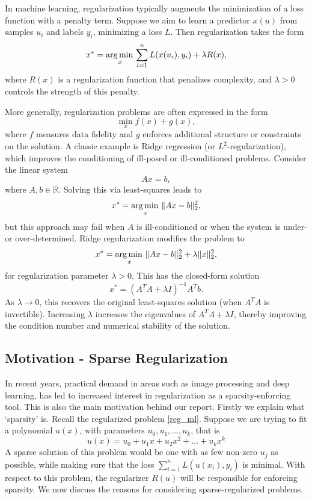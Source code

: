 \documentclass[11pt, twoside]{report}
\begin{document}
In machine learning, regularization typically augments the minimization of a loss function with a penalty term. Suppose we aim to learn a predictor $x(u)$ from samples $u_i$ and labels $y_i$, minimizing a loss $L$. Then regularization takes the form
\begin{equation} \label{reg_ml}
    x^* = \operatorname*{arg\, min \,}_x \sum_{i=1}^n L(x(u_i), y_i) + \lambda R(x),
\end{equation}
where $R(x)$ is a regularization function that penalizes complexity, and $\lambda > 0$ controls the strength of this penalty.

More generally, regularization problems are often expressed in the form
\[
\min_x f(x) + g(x),
\]
where $f$ measures data fidelity and $g$ enforces additional structure or constraints on the solution. A classic example is Ridge regression (or $L^2$-regularization), which improves the conditioning of ill-posed or ill-conditioned problems. Consider the linear system
\begin{equation} \label{lin_sys}
    Ax = b,
\end{equation}
where $A, b \in \mathbb{R}$. Solving this via least-squares leads to
\[
x^* = \operatorname*{arg\, min \,}_{x} \|Ax - b\|_2^2,
\]
but this approach may fail when $A$ is ill-conditioned or when the system is under- or over-determined. Ridge regularization modifies the problem to
\[
x^* = \operatorname*{arg\, min \,}_{x} \|Ax - b\|_2^2 + \lambda \|x\|_2^2,
\]
for regularization parameter $\lambda > 0$. This has the closed-form solution
\[
x^* = (A^T A + \lambda I)^{-1} A^T b.
\]
As $\lambda \to 0$, this recovers the original least-squares solution (when $A^T A$ is invertible). Increasing $\lambda$ increases the eigenvalues of $A^T A + \lambda I$, thereby improving the condition number and numerical stability of the solution.


\subsection{Motivation - Sparse Regularization}
In recent years, practical demand in areas such as image processing and deep learning, has led to increased interest in regularization as a sparsity-enforcing tool. This is also the main motivation behind our report. Firstly we explain what `sparsity' is. Recall the regularized problem \ref{reg_ml}. Suppose we are trying to fit a polynomial $u(x)$, with parameters $u_0,u_1,\hdots, u_k$, that is
\[u(x) = u_0 + u_1 x + u_2 x^2 + \hdots + u_kx^k\]
A sparse solution of this problem would be one with as few non-zero $u_j$ as possible, while making sure that the loss $\sum^n_{i=1} L(u(x_i),y_i)$ is minimal. With respect to this problem, the regularizer $R(u)$ will be responsible for enforcing sparsity. We now discuss the reasons for considering sparse-regularized problems.
\end{document}
